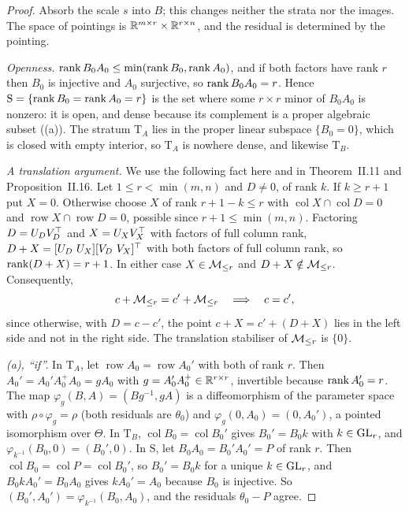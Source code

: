 \begin{proof}
Absorb the scale $s$ into $B$; this changes neither the strata nor the images. The space of pointings is
$\R^{m\times r}\times\R^{r\times n}$, and the residual is determined by the pointing.

\emph{Openness.} $\rk B_0A_0\le\min(\rk B_0,\rk A_0)$, and if both factors have rank $r$ then $B_0$ is injective and
$A_0$ surjective, so $\rk B_0A_0=r$. Hence $\mathrm S=\{\rk B_0=\rk A_0=r\}$ is the set where some $r\times r$ minor of
$B_0A_0$ is nonzero: it is open, and dense because its complement is a proper algebraic subset ((a)). The
stratum $\mathrm T_A$ lies in the proper linear subspace $\{B_0=0\}$, which is closed with empty interior, so
$\mathrm T_A$ is nowhere dense, and likewise $\mathrm T_B$.

\emph{A translation argument.} We use the following fact here and in Theorem~II.11 and Proposition~II.16. Let
$1\le r<\min(m,n)$ and $D\ne0$, of rank $k$. If $k\ge r+1$ put $X=0$. Otherwise choose $X$ of rank $r+1-k\le r$ with
$\operatorname{col}X\cap\operatorname{col}D=0$ and $\operatorname{row}X\cap\operatorname{row}D=0$, possible since
$r+1\le\min(m,n)$. Factoring $D=U_DV_D\T$ and $X=U_XV_X\T$ with factors of full column rank, $D+X=[U_D\ U_X][V_D\ V_X]\T$
with both factors of full column rank, so $\rk(D+X)=r+1$. In either case $X\in\Mr$ and $D+X\notin\Mr$. Consequently,
\begin{equation}\label{eq:translation-stabiliser}
  c+\Mr=c'+\Mr\quad\Longrightarrow\quad c=c',
\end{equation}
since otherwise, with $D=c-c'$, the point $c+X=c'+(D+X)$ lies in the left side and not in the right side. The
translation stabiliser of $\Mr$ is $\{0\}$.

\emph{(a), ``if''.} In $\mathrm T_A$, let $\operatorname{row}A_0=\operatorname{row}A_0'$ with both of rank $r$. Then
$A_0'=A_0'A_0^+A_0=gA_0$ with $g=A_0'A_0^+\in\R^{r\times r}$, invertible because $\rk A_0'=r$. The map
$\varphi_g(B,A)=(Bg^{-1},gA)$ is a diffeomorphism of the parameter space with $\rho\circ\varphi_g=\rho$ (both residuals
are $\theta_0$) and $\varphi_g(0,A_0)=(0,A_0')$, a pointed isomorphism over $\Theta$. In $\mathrm T_B$,
$\operatorname{col}B_0=\operatorname{col}B_0'$ gives $B_0'=B_0k$ with $k\in\GL_r$, and $\varphi_{k^{-1}}(B_0,0)=(B_0',0)$.
In $\mathrm S$, let $B_0A_0=B_0'A_0'=P$ of rank $r$. Then
$\operatorname{col}B_0=\operatorname{col}P=\operatorname{col}B_0'$, so $B_0'=B_0k$ for a unique $k\in\GL_r$, and
$B_0kA_0'=B_0A_0$ gives $kA_0'=A_0$ because $B_0$ is injective. So $(B_0',A_0')=\varphi_{k^{-1}}(B_0,A_0)$, and the
residuals $\theta_0-P$ agree.


\end{proof}
